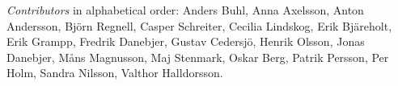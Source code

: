 \emph{Contributors} in alphabetical order:
Anders Buhl,
Anna Axelsson,
Anton Andersson,
Björn Regnell,
Casper Schreiter,
Cecilia Lindskog,
Erik Bjäreholt,
Erik Grampp,
Fredrik Danebjer,
Gustav Cedersjö,
Henrik Olsson,
Jonas Danebjer, 
Måns Magnusson,
Maj Stenmark,
Oskar Berg,
Patrik Persson,
Per Holm,
Sandra Nilsson,
Valthor Halldorsson. 
